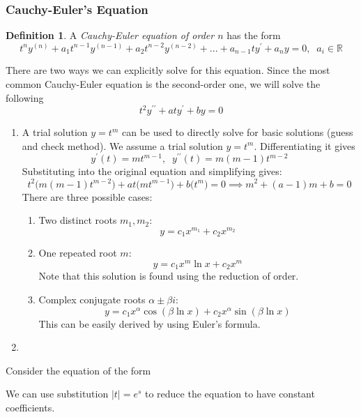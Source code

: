 \documentclass{article}
\theoremstyle{remark}
\theoremstyle{definition}
\newtheorem{definition}{Definition}[section]
\begin{document}
\subsubsection{Cauchy-Euler's Equation}

\begin{definition}
A \textit{Cauchy-Euler equation of order $n$} has the form 
\[t^n y^{(n)} + a_1 t^{n-1} y^{(n-1)} + a_2 t^{n-2} y^{(n-2)} + ... + a_{n-1} t y^\prime + a_n y = 0, \;\; a_i \in \mathbb{R}\]
\end{definition}

There are two ways we can explicitly solve for this equation. Since the most common Cauchy-Euler equation is the second-order one, we will solve the following 
\[t^2 y^{\prime \prime} + a t y^\prime + b y = 0\]
\begin{enumerate}
    \item A trial solution $y = t^m$ can be used to directly solve for basic solutions (guess and check method). We assume a trial solution $y = t^m$. Differentiating it gives
    \[y^\prime (t) = m t^{m-1}, \;\; y^{\prime\prime} (t) = m (m-1) t^{m-2}\]
    Substituting into the original equation and simplifying gives: 
    \[t^2 \big( m(m-1)t^{m-2}\big) + at \big( m t^{m-1}\big) + b \big( t^m \big) = 0 \implies m^2 + (a-1) m + b = 0\]
    There are three possible cases: 
    \begin{enumerate}
        \item Two distinct roots $m_1, m_2$: 
        \[y = c_1 x^{m_1} + c_2 x^{m_2}\]
        \item One repeated root $m$: 
        \[y = c_1 x^m \ln{x} + c_2 x^m\]
        Note that this solution is found using the reduction of order. 
        \item Complex conjugate roots $\alpha \pm \beta i$: 
        \[y = c_1 x^{\alpha} \cos(\beta \ln{x}) + c_2 x^\alpha \sin(\beta \ln{x})\] 
        This can be easily derived by using Euler's formula. 
    \end{enumerate}
    \item 
\end{enumerate}


Consider the equation of the form 

We can use substitution $|t| = e^s$ to reduce the equation to have constant coefficients. 
\end{document}
